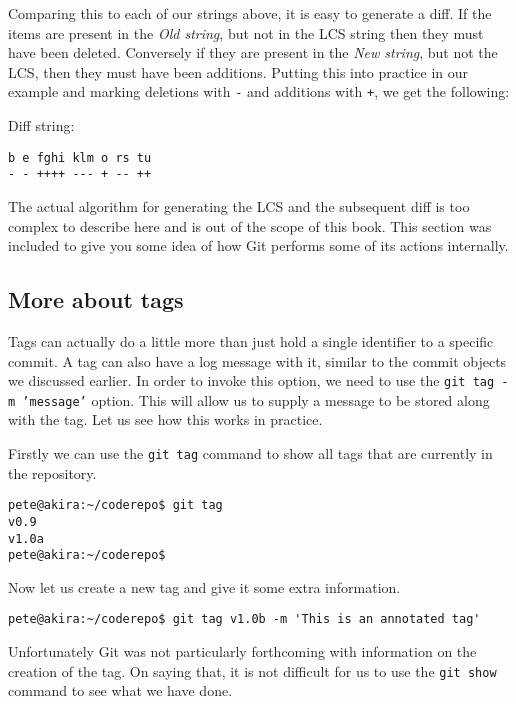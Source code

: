 Comparing this to each of our strings above, it is easy to generate a diff.  If the items are present in the \emph{Old string}, but not in the LCS string then they must have been deleted.  Conversely if they are present in the \emph{New string}, but not the LCS, then they must have been additions.  Putting this into practice in our example and marking deletions with \texttt{-} and additions with \texttt{+}, we get the following:

Diff string:
\begin{Verbatim}[frame=leftline,framerule=1mm,fontsize=\relsize{-3}]
b e fghi klm o rs tu
- - ++++ --- + -- ++
\end{Verbatim}

The actual algorithm for generating the LCS and the subsequent diff is too complex to describe here and is out of the scope of this book.  This section was included to give you some idea of how Git performs some of its actions internally.

\subsection{More about tags}
Tags can actually do a little more than just hold a single identifier to a specific commit.  A tag can also have a log message with it, similar to the commit objects we discussed earlier.  In order to invoke this option, we need to use the \texttt{git tag -m 'message'} option.  This will allow us to supply a message to be stored along with the tag.  Let us see how this works in practice.

Firstly we can use the \texttt{git tag} command to show all tags that are currently in the repository.

\begin{Verbatim}[frame=leftline,framerule=1mm,fontsize=\relsize{-3}] 
pete@akira:~/coderepo$ git tag
v0.9
v1.0a
pete@akira:~/coderepo$ 
\end{Verbatim}

Now let us create a new tag and give it some extra information.

\begin{Verbatim}[frame=leftline,framerule=1mm,fontsize=\relsize{-3}] 
pete@akira:~/coderepo$ git tag v1.0b -m 'This is an annotated tag'
\end{Verbatim}

Unfortunately Git was not particularly forthcoming with information on the creation of the tag.  On saying that, it is not difficult for us to use the \texttt{git show} command to see what we have done.

